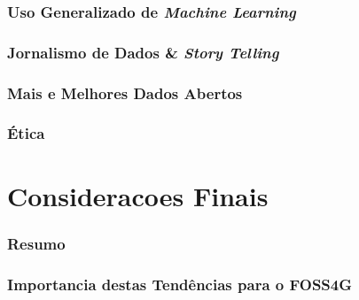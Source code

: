 \documentclass[hyperref={pdfpagelabels=true}]{beamer}
\begin{document}
\begin{frame}
\frametitle{Uso Generalizado de \textit{Machine Learning}}


\end{frame}

\begin{frame}
\frametitle{Jornalismo de Dados \& \textit{Story Telling}}


\end{frame}

\begin{frame}
\frametitle{Mais e Melhores Dados Abertos}


\end{frame}

\begin{frame}
\frametitle{\'{E}tica}


\end{frame}

\section{Consideracoes Finais} 
\begin{frame}
\frametitle{Resumo}


\end{frame}

\begin{frame}
\frametitle{Importancia destas Tend\^{e}ncias para o FOSS4G}


\end{frame}
\end{document}
